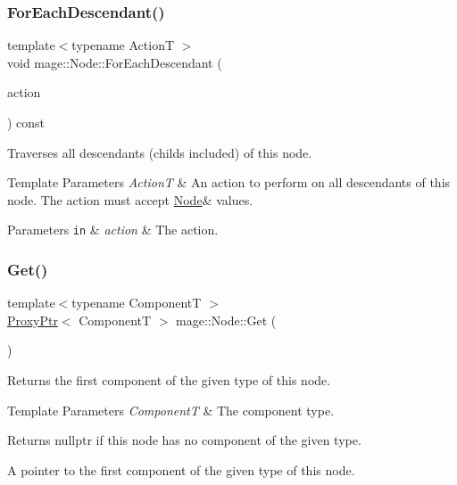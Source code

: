 \subsubsection{\texorpdfstring{For\+Each\+Descendant()}{ForEachDescendant()}}
{\footnotesize\ttfamily template$<$typename ActionT $>$ \\
void mage\+::\+Node\+::\+For\+Each\+Descendant (\begin{DoxyParamCaption}\item[{ActionT}]{action }\end{DoxyParamCaption}) const}

Traverses all descendants (childs included) of this node.


\begin{DoxyTemplParams}{Template Parameters}
{\em ActionT} & An action to perform on all descendants of this node. The action must accept {\ttfamily \hyperlink{classmage_1_1_node}{Node}\&} values. \\
\hline
\end{DoxyTemplParams}

\begin{DoxyParams}[1]{Parameters}
\mbox{\tt in}  & {\em action} & The action. \\
\hline
\end{DoxyParams}
\hypertarget{classmage_1_1_node_af514b0282820f1d071fc24a2b815ae82}{}\label{classmage_1_1_node_af514b0282820f1d071fc24a2b815ae82} 
\subsubsection{\texorpdfstring{Get()}{Get()}\hspace{0.1cm}{\footnotesize\ttfamily [1/3]}}
{\footnotesize\ttfamily template$<$typename ComponentT $>$ \\
\hyperlink{classmage_1_1_proxy_ptr}{Proxy\+Ptr}$<$ ComponentT $>$ mage\+::\+Node\+::\+Get (\begin{DoxyParamCaption}{ }\end{DoxyParamCaption})\hspace{0.3cm}{\ttfamily [noexcept]}}

Returns the first component of the given type of this node.


\begin{DoxyTemplParams}{Template Parameters}
{\em ComponentT} & The component type. \\
\hline
\end{DoxyTemplParams}
\begin{DoxyReturn}{Returns}
{\ttfamily nullptr} if this node has no component of the given type. 

A pointer to the first component of the given type of this node. 
\end{DoxyReturn}
\hypertarget{classmage_1_1_node_a597f86bd9faecda719c37c4b2c73231e}{}\label{classmage_1_1_node_a597f86bd9faecda719c37c4b2c73231e} 
